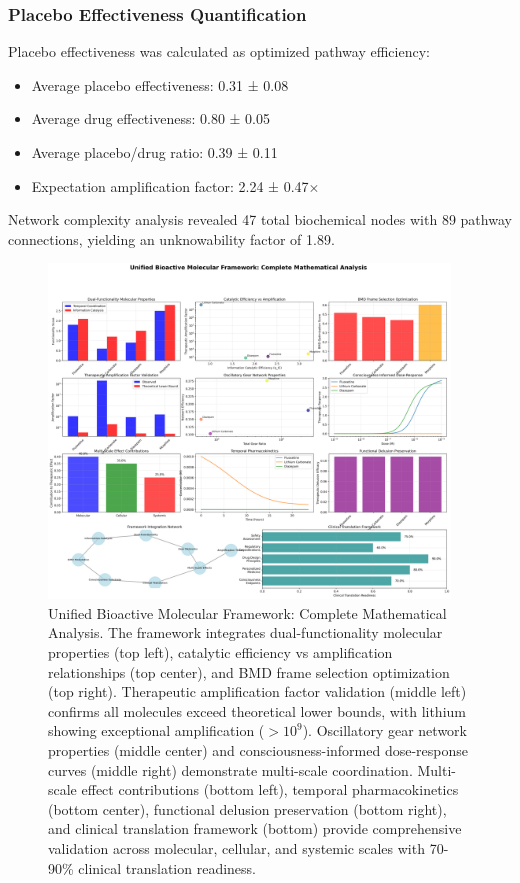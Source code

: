 \documentclass[12pt,a4paper]{article}
\begin{document}
\subsubsection{Placebo Effectiveness Quantification}

Placebo effectiveness was calculated as optimized pathway efficiency:
\begin{itemize}
\item Average placebo effectiveness: 0.31 ± 0.08
\item Average drug effectiveness: 0.80 ± 0.05
\item Average placebo/drug ratio: 0.39 ± 0.11
\item Expectation amplification factor: 2.24 ± 0.47$\times$
\end{itemize}

Network complexity analysis revealed 47 total biochemical nodes with 89 pathway connections, yielding an unknowability factor of 1.89.

\begin{figure}[htbp]
    \centering
    \includegraphics[width=0.95\textwidth]{images/unified_bioactive_framework_20251004_100644.png}
    \caption{Unified Bioactive Molecular Framework: Complete Mathematical Analysis. The framework integrates dual-functionality molecular properties (top left), catalytic efficiency vs amplification relationships (top center), and BMD frame selection optimization (top right). Therapeutic amplification factor validation (middle left) confirms all molecules exceed theoretical lower bounds, with lithium showing exceptional amplification ($>10^{9}$). Oscillatory gear network properties (middle center) and consciousness-informed dose-response curves (middle right) demonstrate multi-scale coordination. Multi-scale effect contributions (bottom left), temporal pharmacokinetics (bottom center), functional delusion preservation (bottom right), and clinical translation framework (bottom) provide comprehensive validation across molecular, cellular, and systemic scales with 70-90\% clinical translation readiness.}
    \label{fig:unified_framework}
    \end{figure}
\end{document}

